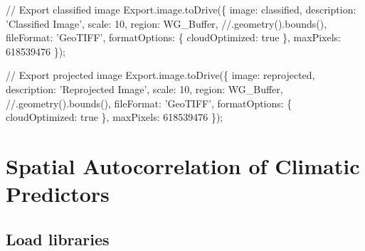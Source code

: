 \documentclass[]{article}
\newenvironment{Shaded}{}{}
\newcommand{\AttributeTok}[1]{#1}
\newcommand{\CommentTok}[1]{\textcolor[rgb]{0.00,0.50,0.00}{#1}}
\newcommand{\DataTypeTok}[1]{#1}
\newcommand{\DecValTok}[1]{#1}
\newcommand{\KeywordTok}[1]{\textcolor[rgb]{0.00,0.00,1.00}{#1}}
\newcommand{\NormalTok}[1]{#1}
\newcommand{\OperatorTok}[1]{#1}
\newcommand{\StringTok}[1]{\textcolor[rgb]{0.00,0.50,0.50}{#1}}
\newcommand{\VariableTok}[1]{#1}
\begin{document}
\begin{Shaded}
\begin{Highlighting}[numbers=left,,]
\CommentTok{// Export classified image}
\VariableTok{Export}\NormalTok{.}\VariableTok{image}\NormalTok{.}\AttributeTok{toDrive}\NormalTok{(}\OperatorTok{\{}
  \DataTypeTok{image}\OperatorTok{:}\NormalTok{ classified}\OperatorTok{,}
  \DataTypeTok{description}\OperatorTok{:} \StringTok{'Classified Image'}\OperatorTok{,}
  \DataTypeTok{scale}\OperatorTok{:} \DecValTok{10}\OperatorTok{,}
  \DataTypeTok{region}\OperatorTok{:}\NormalTok{ WG_Buffer}\OperatorTok{,}      \CommentTok{//.geometry().bounds(),}
  \DataTypeTok{fileFormat}\OperatorTok{:} \StringTok{'GeoTIFF'}\OperatorTok{,}
  \DataTypeTok{formatOptions}\OperatorTok{:} \OperatorTok{\{}
    \DataTypeTok{cloudOptimized}\OperatorTok{:} \KeywordTok{true}
  \OperatorTok{\},}
  \DataTypeTok{maxPixels}\OperatorTok{:} \DecValTok{618539476}
\OperatorTok{\}}\NormalTok{)}\OperatorTok{;}

\CommentTok{// Export projected image}
\VariableTok{Export}\NormalTok{.}\VariableTok{image}\NormalTok{.}\AttributeTok{toDrive}\NormalTok{(}\OperatorTok{\{}
  \DataTypeTok{image}\OperatorTok{:}\NormalTok{ reprojected}\OperatorTok{,}
  \DataTypeTok{description}\OperatorTok{:} \StringTok{'Reprojected Image'}\OperatorTok{,}
  \DataTypeTok{scale}\OperatorTok{:} \DecValTok{10}\OperatorTok{,}
  \DataTypeTok{region}\OperatorTok{:}\NormalTok{ WG_Buffer}\OperatorTok{,}         \CommentTok{//.geometry().bounds(),}
  \DataTypeTok{fileFormat}\OperatorTok{:} \StringTok{'GeoTIFF'}\OperatorTok{,}
  \DataTypeTok{formatOptions}\OperatorTok{:} \OperatorTok{\{}
    \DataTypeTok{cloudOptimized}\OperatorTok{:} \KeywordTok{true}
  \OperatorTok{\},}
  \DataTypeTok{maxPixels}\OperatorTok{:} \DecValTok{618539476}
\OperatorTok{\}}\NormalTok{)}\OperatorTok{;}
\end{Highlighting}
\end{Shaded}

\hypertarget{spatial-autocorrelation-of-climatic-predictors}{%
\section{Spatial Autocorrelation of Climatic Predictors}\label{spatial-autocorrelation-of-climatic-predictors}}

\hypertarget{load-libraries}{%
\subsection{Load libraries}\label{load-libraries}}
\end{document}
